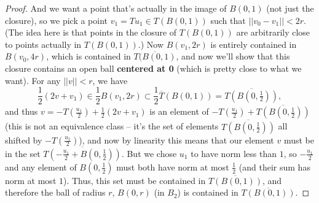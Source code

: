 \begin{proof}
And we want a point that's actually in the image of $B(0, 1)$ (not just the closure), so we pick a point $v_1 = Tu_1 \in T(B(0, 1))$ such that $||v_0 - v_1|| < 2r$. (The idea here is that points in the closure of $T(B(0, 1))$ are arbitrarily close to points actually in $T(B(0, 1))$.) Now $B(v_1, 2r)$ is entirely contained in $B(v_0, 4r)$, which is contained in $\overline{T(B(0, 1)}$, and now we'll show that this closure contains an open ball \textbf{centered at 0} (which is pretty close to what we want). For any $||v|| < r$, we have
\[
    \frac{1}{2}(2v + v_1) \in \frac{1}{2}B(v_1, 2r) \subset \frac{1}{2}\overline{T}(B(0, 1)) = \overline{T(B(0, \tfrac{1}{2}))},
\]
and thus $v = -T\left(\frac{u_1}{2}\right) + \frac{1}{2}(2v + v_1)$ is an element of $-T\left(\frac{u_1}{2}\right) + \overline{T(B(0, \frac{1}{2}))}$ (this is not an equivalence class -- it's the set of elements $\overline{T(B(0, \frac{1}{2}))}$ all shifted by $-T\left(\frac{u_1}{2}\right)$), and now by linearity this means that our element $v$ must be in the set $\overline{T\left(-\frac{u_1}{2} + B\left(0, \tfrac{1}{2}\right)\right)}$. But we chose $u_1$ to have norm less than $1$, so $-\frac{u_1}{2}$ and any element of $B(0, \frac{1}{2})$ must both have norm at most $\frac{1}{2}$ (and their sum has norm at most $1$). Thus, this set must be contained in $\overline{T(B(0, 1))}$, and therefore the ball of radius $r$, $B(0, r)$ (in $B_2$) is contained in $\overline{T(B(0, 1))}$. 


\end{proof}

